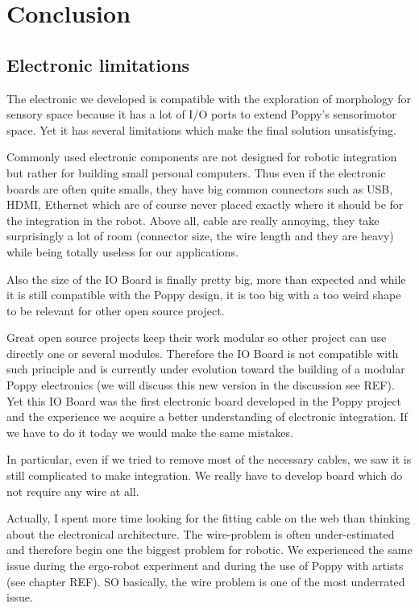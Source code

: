 \section{Conclusion} %


\subsection{Electronic limitations} %

The electronic we developed is compatible with the exploration of morphology for sensory space because it has a lot of I/O ports to extend Poppy's sensorimotor space. Yet it has several limitations which make the final solution unsatisfying.

Commonly used electronic components are not designed for robotic integration but rather for building small personal computers. Thus even if the electronic boards are often quite smalls, they have big common connectors such as USB, HDMI, Ethernet which are of course never placed exactly where it should be for the integration in the robot.
Above all, cable are really annoying, they take surprisingly a lot of room (connector size, the wire length and they are heavy) while being totally useless for our applications.

Also the size of the IO Board is finally pretty big, more than expected and while it is still compatible with the Poppy design, it is too big with a too weird shape to be relevant for other open source project.

Great open source projects keep their work modular so other project can use directly one or several modules. Therefore the IO Board is not compatible with such principle and is currently under evolution toward the building of a modular Poppy electronics (we will discuss this new version in the discussion see REF). Yet this IO Board was the first electronic board developed in the Poppy project and the experience we acquire a better understanding of electronic integration. If we have to do it today we would make the same mistakes.

In particular, even if we tried to remove most of the necessary cables, we saw it is still complicated to make integration. We really have to develop board which do not require any wire at all.

Actually, I spent more time looking for the fitting cable on the web than thinking about the electronical architecture. The wire-problem is often under-estimated and therefore begin one the biggest problem for robotic. We experienced the same issue during the ergo-robot experiment and during the use of Poppy with artists (see chapter REF). SO basically, the wire problem is one of the most underrated issue.




